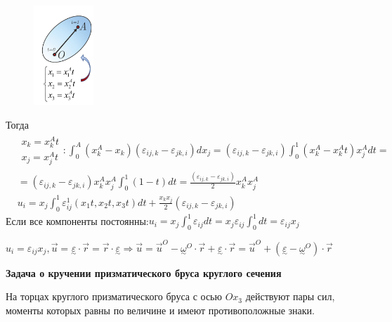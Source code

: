 \begin{figure}[h!]
  \centering
  \includegraphics[width=0.2\textwidth]{images/14.2.jpg}   
\end{figure}

Тогда  
$$
\begin{aligned}
& \begin{array}{l}
x_k=x_k^A t \\
x_j=x_j^A t
\end{array}: \int_0^A\left(x_k^A-x_k\right)\left(\varepsilon_{i j, k}-\varepsilon_{j k, i}\right) d x_j=\left(\varepsilon_{i j, k}-\varepsilon_{j k, i}\right) \int_0^1\left(x_k^A-x_k^A t\right) x_j^A d t= \\
& =\left(\varepsilon_{i j, k}-\varepsilon_{j k, i}\right) x_k^A x_j^A \int_0^1(1-t) d t=\frac{\left(\varepsilon_{i j, k}-\varepsilon_{j k, i}\right)}{2} x_k^A x_j^A \\
& u_i=x_j \int_0^1 \varepsilon_{i j}^1\left(x_1 t, x_2 t, x_3 t\right) d t+\frac{x_k x_j}{2}\left(\varepsilon_{i j, k}-\varepsilon_{j k, i}\right)
\end{aligned}
$$
Если все компоненты постоянны:$\displaystyle u_i=x_j \int_0^1 \varepsilon_{i j} d t =  x_j \varepsilon_{i j} \int_0^1 d t=\varepsilon_{i j} x_j$


$\displaystyle
u_i=\varepsilon_{i j} x_j, \vec{u}=\underset{\sim}{\varepsilon} \cdot \vec{r}=\vec{r} \cdot \underset{\sim}{\varepsilon} \Rightarrow
\vec{u}=\vec{u}^O-{\underset{\sim}{\omega}}^O \cdot \vec{r}+\underset{\sim}{\varepsilon} \cdot \vec{r}=\vec{u}^O+\left(\underset{\sim}{\varepsilon}-{\underset{\sim}{\omega}}^O\right) \cdot \vec{r}
$


\textbf{Задача о кручении призматического бруса круглого сечения}


На торцах круглого призматического бруса с осью $Ox_3$  действуют пары сил,
моменты которых равны по величине и имеют противоположные знаки.

